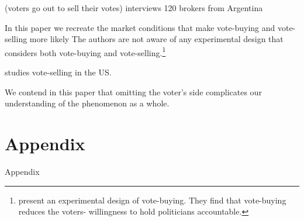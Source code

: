 \documentclass[onesided]{article}\usepackage[]{graphicx}\usepackage[]{color}
\begin{document}
\textcite{Hagene2015} (voters go out to sell their votes)
\textcite{Zarazaga2015a} interviews 120 brokers from Argentina

In this paper we recreate the market conditions that make vote-buying and vote-selling more likely  The authors are not aware of any experimental design that considers both vote-buying and vote-selling.\footnote{\textcite{Leight2020} present an experimental design of vote-buying. They find that vote-buying reduces the voters- willingness to hold politicians accountable.}

\textcite{Bahamonde2020a} studies vote-selling in the US.
 

We contend in this paper that omitting the voter's side complicates our understanding of the phenomenon as a whole. 


\clearpage
\newpage
{}
\setcounter{page}{1}
\printbibliography
\clearpage
\newpage



\clearpage



\begin{center}
\dotfill
{} \dotfill
\dotfill
{}
\end{center}

\clearpage






\setcounter{table}{0}
\renewcommand{\thetable}{A\arabic{table}}
\setcounter{figure}{0}
\renewcommand{\thefigure}{A\arabic{figure}}



\section{Appendix}
\setcounter{page}{1}

Appendix
\end{document}
